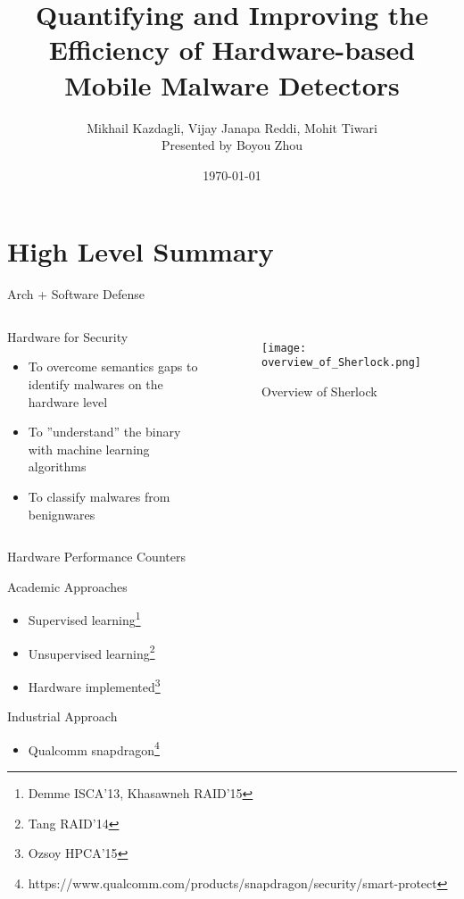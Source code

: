 \documentclass{beamer}
\title[Group Meeting Presentation]{Quantifying and Improving the Efficiency of Hardware-based Mobile Malware Detectors}
\author[bobzhou@bu.edu]{Mikhail Kazdagli, Vijay Janapa Reddi, Mohit Tiwari\\
Presented by Boyou Zhou}
\date[\today]{\today}
\begin{document}
\maketitle

\section{High Level Summary}

\begin{frame}{Arch + Software Defense}
	\begin{columns}[b]
		\begin{block}{Hardware for Security}
			\begin{itemize}
				\item To overcome semantics gaps to identify malwares on the hardware level
				\item To ''understand'' the binary with machine learning algorithms
				\item To classify malwares from benignwares
			\end{itemize}
		\end{block}
		
		\begin{figure}
			\centering
			\texttt{[image: overview\_of\_Sherlock.png]}
			\caption{Overview of Sherlock}
		\end{figure}
	\end{columns}
\end{frame}

\begin{frame}{Hardware Performance Counters}
	\begin{block}{Academic Approaches}
		\begin{itemize}
			\item Supervised learning\footnote[frame]{Demme ISCA'13, Khasawneh RAID'15}
			\item Unsupervised learning\footnote[frame]{Tang RAID'14}
			\item Hardware implemented\footnote[frame]{Ozsoy HPCA'15}
		\end{itemize}
    \end{block}
	\begin{block}{Industrial Approach}
		\begin{itemize}
			\item Qualcomm snapdragon\footnote[frame]{https://www.qualcomm.com/products/snapdragon/security/smart-protect}
		\end{itemize}
	\end{block}
\end{frame}
\end{document}
